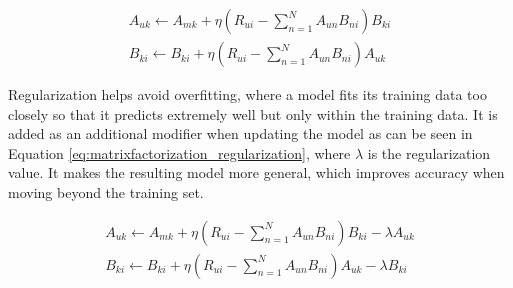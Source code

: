 \begin{equation}\label{eq:matrixfactorization_learningrate}
	\begin{split}
	A_{uk}\leftarrow A_{mk} + \eta(R_{ui}-\sum_{n=1}^{N}A_{un}B_{ni})B_{ki}
	\\
	B_{ki}\leftarrow B_{ki} + \eta(R_{ui}-\sum_{n=1}^{N}A_{un}B_{ni})A_{uk}
	\end{split}
\end{equation}

Regularization helps avoid overfitting, where a model fits its training data too closely so that it predicts extremely well but only within the training data. It is added as an additional modifier when updating the model as can be seen in Equation \ref{eq:matrixfactorization_regularization}, where $\lambda$ is the regularization value. It makes the resulting model more general, which improves accuracy when moving beyond the training set.

\begin{equation}\label{eq:matrixfactorization_regularization}
	\begin{split}
	A_{uk}\leftarrow A_{mk} + \eta(R_{ui}-\sum_{n=1}^{N}A_{un}B_{ni})B_{ki}-\lambda A_{uk}
	\\
	B_{ki}\leftarrow B_{ki} + \eta(R_{ui}-\sum_{n=1}^{N}A_{un}B_{ni})A_{uk} -\lambda B_{ki}
	\end{split}
\end{equation}

